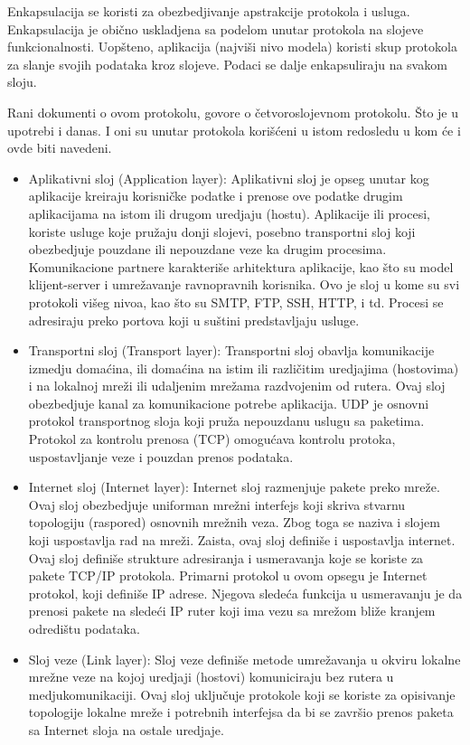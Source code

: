 \documentclass[a4paper,12pt, master]{etf}
\begin{document}
	Enkapsulacija se koristi za obezbedjivanje apstrakcije protokola i usluga.
	Enkapsulacija je obi\v{c}no uskladjena sa podelom unutar protokola na
	slojeve funkcionalnosti. Uop\v{s}teno, aplikacija (najvi\v{s}i nivo modela)
	koristi skup protokola za slanje svojih podataka kroz slojeve. Podaci se
	dalje enkapsuliraju na svakom sloju.

	Rani dokumenti o ovom protokolu, govore o \v{c}etvoroslojevnom protokolu.
	\v{S}to je u upotrebi i	danas. I oni su unutar protokola kori\v{s}\'{c}eni
	u istom redosledu u kom \'{c}e i ovde biti navedeni.

	\begin{itemize}
		\item Aplikativni sloj (Application layer):
		Aplikativni sloj je opseg unutar kog aplikacije kreiraju korisni\v{c}ke
		podatke i prenose ove podatke drugim aplikacijama na istom ili drugom
		uredjaju (hostu). Aplikacije ili procesi, koriste usluge koje
		pru\v{z}aju donji slojevi, posebno transportni sloj koji
		obezbedjuje pouzdane ili nepouzdane veze ka drugim procesima.
		Komunikacione partnere karakteri\v{s}e arhitektura aplikacije, kao
		\v{s}to su model klijent-server i umre\v{z}avanje ravnopravnih
		korisnika. Ovo je sloj u kome su svi protokoli vi\v{s}eg nivoa, kao
		\v{s}to su SMTP, FTP, SSH, HTTP, i td. Procesi se adresiraju preko
		portova koji u su\v{s}tini predstavljaju usluge.
		\item Transportni sloj (Transport layer):
		Transportni sloj obavlja komunikacije izmedju doma\'{c}ina, ili
		doma\'{c}ina na istim ili razli\v{c}itim uredjajima (hostovima) i na
		lokalnoj mre\v{z}i ili udaljenim mre\v{z}ama razdvojenim od rutera.
		Ovaj sloj obezbedjuje kanal za komunikacione potrebe aplikacija. UDP je
		osnovni protokol transportnog sloja koji pru\v{z}a nepouzdanu uslugu sa
		paketima. Protokol za kontrolu prenosa (TCP) omogu\'{c}ava kontrolu
		protoka, uspostavljanje veze i pouzdan prenos podataka.
		\item Internet sloj (Internet layer):
		Internet sloj razmenjuje pakete preko mre\v{z}e. Ovaj sloj obezbedjuje
		uniforman mre\v{z}ni interfejs koji skriva stvarnu topologiju (raspored)
		 osnovnih mre\v{z}nih veza. Zbog toga se naziva i slojem koji
		uspostavlja rad na mre\v{z}i. Zaista, ovaj sloj defini\v{s}e i
		uspostavlja	internet. Ovaj sloj defini\v{s}e strukture adresiranja i
		usmeravanja koje se koriste za pakete TCP/IP protokola. Primarni
		protokol u ovom opsegu je Internet protokol, koji defini\v{s}e IP
		adrese. Njegova slede\'{c}a funkcija u usmeravanju je da prenosi pakete
		na slede\'{c}i IP ruter koji ima vezu sa mre\v{z}om bli\v{z}e kranjem
		odredi\v{s}tu podataka.
		\item Sloj veze (Link layer):
		Sloj veze defini\v{s}e metode umre\v{z}avanja u okviru lokalne
		mre\v{z}ne veze na kojoj uredjaji (hostovi) komuniciraju bez rutera u
		medjukomunikaciji. Ovaj sloj uklju\v{c}uje protokole koji se koriste za
		opisivanje topologije lokalne mre\v{z}e i potrebnih interfejsa da bi se
		zavr\v{s}io prenos paketa sa Internet sloja na ostale uredjaje.
	\end{itemize}
\end{document}
